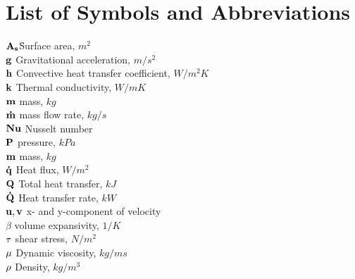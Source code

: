%
%
%
%
%
%



\chapter*{List of Symbols and Abbreviations}




\begin{tabbing}



\hspace{1cm}\= {$ \bf A_ s  $}\quad\= Surface area, $ m^2 $\\[5pt]

\> {$ \bf g  $} \> Gravitational acceleration, $ m / s^2 $\\[5pt]

\> {$ \bf h $} \>   Convective heat transfer coefficient, $W/m^2K$\\[5pt]

\> {$ \bf k  $} \> Thermal conductivity, $W/mK$\\[5pt]

\> {$ \bf m  $} \>  mass, $kg$\\

\> {$ \bf \dot{m}  $} \>  mass flow rate, $kg/s$\\

\> {$ \bf Nu  $} \>  Nusselt number \\

\> {$ \bf P  $} \>  pressure, $kPa$ \\

\> {$ \bf m  $} \>  mass, $kg$\\

\> {$ \bf \dot{q}  $} \>  Heat flux, $W/m^2$ \\

\> {$ \bf Q  $} \>  Total heat transfer, $kJ$ \\

\> {$ \bf \dot{Q}  $} \>  Heat transfer rate, $kW$ \\

\> {$ \bf u,v  $} \>  x- and y-component of velocity \\

\> { \bf $ \beta $ } \>  volume expansivity, $1/K$ \\

\> {$ \bf \tau  $} \>  shear stress, $N/m^2$ \\

\> {$ \bf \mu  $} \>  Dynamic viscosity, $kg/ms$ \\

\> {$ \bf \rho  $} \>  Density, $kg/m^3$\\











\end{tabbing}